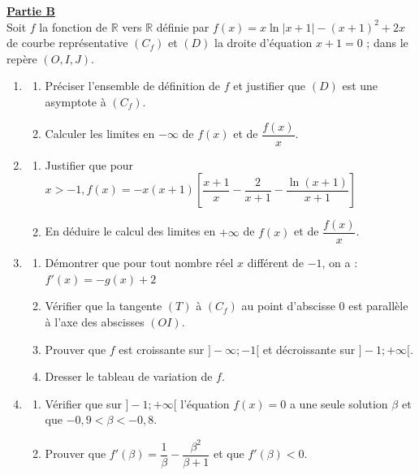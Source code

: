 \documentclass[12pt,a4paper]{article}
\begin{document}
\noindent \underline{\textbf{Partie B}} \\
Soit $f$ la fonction de $\mathbb{R}$ vers $\mathbb{R}$ définie par $f(x) = x\ln|x+1| - (x+1)^2 + 2x$ de courbe représentative $(C_f)$ et $(D)$ la droite d'équation $x + 1 = 0$ ; dans le repère $(O, I, J)$.
\begin{enumerate}
    \item \begin{enumerate}
        \item Préciser l'ensemble de définition de $f$ et justifier que $(D)$ est une asymptote à $(C_f)$.
        \item Calculer les limites en $-\infty$ de $f(x)$ et de $\dfrac{f(x)}{x}$.
    \end{enumerate}
    \item \begin{enumerate}
        \item Justifier que pour $x > -1, f(x) = -x(x+1) \left[ \dfrac{x+1}{x} - \dfrac{2}{x+1} - \dfrac{\ln(x+1)}{x+1} \right]$
        \item En déduire le calcul des limites en $+\infty$ de $f(x)$ et de $\dfrac{f(x)}{x}$.
    \end{enumerate}
    \item \begin{enumerate}
        \item Démontrer que pour tout nombre réel $x$ différent de $-1$, on a : $f'(x) = -g(x) + 2$
        \item Vérifier que la tangente $(T)$ à $(C_f)$ au point d'abscisse 0 est parallèle à l'axe des abscisses $(OI)$.
        \item Prouver que $f$ est croissante sur $]-\infty; -1[$ et décroissante sur $]-1; +\infty[$.
        \item Dresser le tableau de variation de $f$.
    \end{enumerate}
    \item \begin{enumerate}
        \item Vérifier que sur $]-1; +\infty[$ l'équation $f(x) = 0$ a une seule solution $\beta$ et que $-0,9 < \beta < -0,8$.
        \item Prouver que $f'(\beta) = \dfrac{1}{\beta} - \dfrac{\beta^2}{\beta+1}$ et que $f'(\beta) < 0$.
    \end{enumerate}
\end{enumerate}

\vspace{0.5cm}
\end{document}
